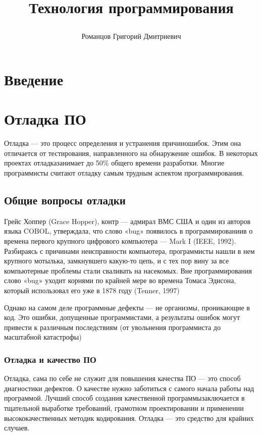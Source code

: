 \documentclass[a4paper]{article}
\title{
\textbf{Технология программирования}

}
\author{Романцов Григорий Дмитриевич}
\date{}
\begin{document}
\maketitle
\newpage
\tableofcontents
\newpage
\section{Введение}

\section{Отладка ПО}

Отладка —  это  процесс  определения  и  устранения  причиношибок.  Этим  она  отличается  от  тестирования,  направленного на обнаружение ошибок. В
некоторых проектах отладказанимает  до  50\%  общего  времени  разработки. Многие  программисты считают отладку самым трудным аспектом программирования.

\subsection{Общие вопросы отладки}

Грейс Хоппер  (Grace  Hopper),  контр --- адмирал  ВМС  США  и  один  из  авторов  языка  COBOL,  утверждала,  что  слово  «bug»  появилось  в  программированиив о  времена  первого  крупного  цифрового  компьютера  —  Mark  I  (IEEE,  1992).  Разбираясь  с  причинами  неисправности компьютера,  программисты  нашли  в  нем крупного  мотылька,  замкнувшего  какую-то  цепь,  и  с  тех  пор  вину  за  все  компьютерные  проблемы  стали  сваливать  на  насекомых.  Вне  программирования  слово «bug»  уходит  корнями  по  крайней  мере  во  времена  Томаса  Эдисона,  который  использовал  его  уже  в  1878  году  (Tenner,  1997)

Однако  на  самом  деле  программные  дефекты  —  не  организмы,  проникающие  в код. Это ошибки, допущенные программистами,  а  результаты  ошибок могут привести к различным последствиям (от увольнения программиста до масштабной катастрофы)

\subsubsection{Отладка и качество ПО}

Отладка,  сама  по  себе  не  служит  для  повышения  качества  ПО — это способ диагностики дефектов. О качестве нужно заботиться с самого начала  работы  над  программой.  Лучший  способ  создания  качественной  программызаключается  в  тщательной  выработке  требований,  грамотном  проектировании  и применении  высококачественных  методик  кодирования.  Отладка  —  это  средство для  крайних  случаев.
\end{document}
